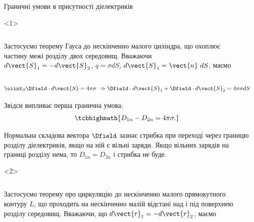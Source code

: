 \documentclass[onlytextwidth]{beamer}
\begin{document}
\begin{frame}{Граничні умови в присутності діелектриків}{}
	\begin{onlyenv}
		\begin{columns}
			\begin{column}{0.6\linewidth}
				\begin{block}{}\justifying
					Застосуємо теорему Гауса до нескінченно малого циліндра, що охоплює частину межі
					розділу двох
					середовищ. Вважаючи $d\vect{S}_1 = - d\vect{S}_2$, $q = \sigma dS$,
					$d\vect{S}_1 =
						\vect{n}\ dS$,
					маємо
				\end{block}
			\end{column}
			\begin{column}{0.4\linewidth}\centering
				
			\end{column}
		\end{columns}
		\begin{block}{}
			\begin{equation*}
				\oiint_S \Dfield\cdot d\vect{S} = 4\pi\sigma\ \Rightarrow  \Dfield\cdot
				d\vect{S}_1 +
				\Dfield\cdot d\vect{S}_2 = 4\pi\sigma dS
			\end{equation*}
		\end{block}
		\begin{block}{}
			Звідси випливає перша гранична умова:
			\begin{equation*}
				\tcbhighmath{
					D_{1n} - D_{2n} = 4\pi\sigma.
				}
			\end{equation*}
		\end{block}
		\begin{alertblock}{}\justifying
			Нормальна складова вектора $\Dfield$ зазнає стрибка при
			переході через границю розділу діелектриків, якщо на ній є вільні заряди. Якщо вільних
			зарядів на границі розділу нема, то $D_{1n} = D_{2n}$ і стрибка не буде.
		\end{alertblock}
	\end{onlyenv}
	\begin{onlyenv}
		\begin{columns}
			\begin{column}{0.6\linewidth}
				\begin{block}{}\justifying
					Застосуємо теорему про циркуляцію до нескінченно малого прямокутного
					контуру $L$, що проходить на нескінченно малій відстані над і під поверхнею
					розділу середовищ. Вважаючи, що $d\vect{r}_1 = -d\vect{r}_2$, маємо

\end{block}
\end{column}
\end{columns}
\end{onlyenv}
\end{frame}
\end{document}
